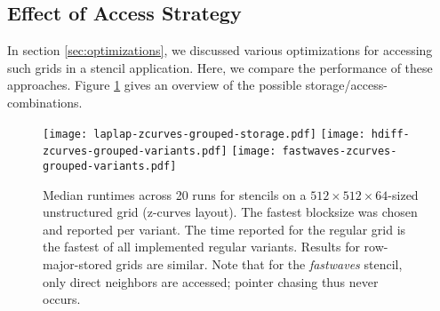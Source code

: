 \subsection{Effect of Access Strategy}

In section \ref{sec:optimizations}, we discussed various optimizations for accessing such grids in a stencil application. Here, we compare the performance of these approaches. Figure \ref{fig:storage-access} gives an overview of the possible storage/access-combinations.

\begin{figure}
	\texttt{[image: laplap-zcurves-grouped-storage.pdf]} %
	\texttt{[image: hdiff-zcurves-grouped-variants.pdf]} %
	\texttt{[image: fastwaves-zcurves-grouped-variants.pdf]} %
	\caption{\label{fig:storage-access} Median runtimes across 20 runs for stencils on a $512\times512\times 64$-sized unstructured grid (z-curves layout). The fastest blocksize was chosen and reported per variant. The time reported for the regular grid is the fastest of all implemented regular variants. Results for row-major-stored grids are similar. Note that for the \emph{fastwaves} stencil, only direct neighbors are accessed; pointer chasing thus never occurs.}
\end{figure}

